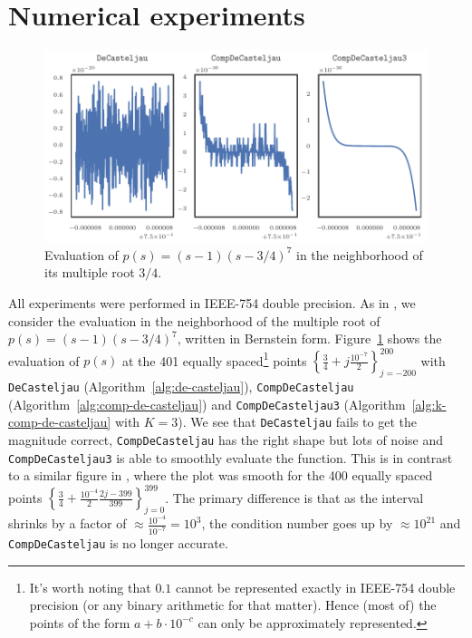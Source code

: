 \section{Numerical experiments}\label{sec:numerical}

\begin{figure}
  \includegraphics{../images/k-compensated/de_casteljau_smooth_drawing.pdf}
  \centering
  \captionsetup{width=.75\linewidth}
  \caption{Evaluation of \(p(s) = (s - 1)\left(s - 3/4\right)^7\)
    in the neighborhood of its multiple root \(3/4\).}
  \label{fig:smooth-drawing}
\end{figure}

All experiments were performed in IEEE-754 double precision.
As in \cite{Jiang2010}, we consider the evaluation in the neighborhood
of the multiple root of \(p(s) = (s - 1)\left(s - 3/4\right)^7\),
written in Bernstein form.
Figure~\ref{fig:smooth-drawing} shows the evaluation of \(p(s)\) at
the 401 equally spaced\footnote{It's worth noting that \(0.1\) cannot
be represented exactly in IEEE-754 double precision (or any binary
arithmetic for that matter). Hence (most of) the points of the form
\(a + b \cdot 10^{-c}\) can only be approximately represented.} points
\(\left\{\frac{3}{4} + j \frac{10^{-7}}{2}\right\}_{j=-200}^{200}\)
with \texttt{DeCasteljau} (Algorithm~\ref{alg:de-casteljau}),
\texttt{CompDeCasteljau} (Algorithm~\ref{alg:comp-de-casteljau})
and \texttt{CompDeCasteljau3} (Algorithm~\ref{alg:k-comp-de-casteljau}
with \(K = 3\)). We see that \texttt{DeCasteljau} fails to get the
magnitude correct, \texttt{CompDeCasteljau} has the right shape but
lots of noise and \texttt{CompDeCasteljau3} is able to smoothly evaluate
the function. This is in contrast to a similar figure in \cite{Jiang2010},
where the plot was smooth for the 400 equally spaced points
\(\left\{\frac{3}{4} + \frac{10^{-4}}{2} \frac{2j - 399}{399}
\right\}_{j=0}^{399}\). The primary difference is that as the interval
shrinks by a factor of \(\approx \frac{10^{-4}}{10^{-7}} = 10^3\), the
condition number goes up by \(\approx 10^{21}\) and \texttt{CompDeCasteljau}
is no longer accurate.

